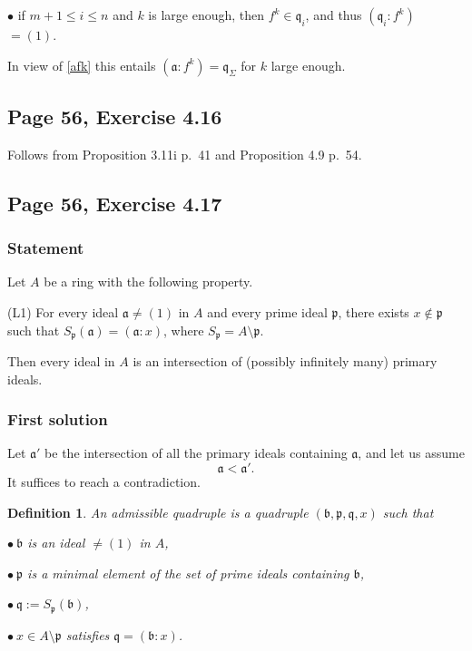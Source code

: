 \documentclass[parskip=half,fontsize=12pt]{scrartcl}%
\newcommand{\mf}{\mathfrak}
\newcommand{\aaa}{\mf a}
\newcommand{\bbb}{\mf b}
\newcommand{\ppp}{\mf p}
\newcommand{\qqq}{\mf q}
\newcommand{\bu}{\bullet}
\newtheorem{df}[thm]{Definition}
\begin{document}
$\bu$ if $m+1\le i\le n$ and $k$ is large enough, then $f^k\in\qqq_i$, and thus $(\qqq_i:f^k)$ $=(1)$.

In view of \eqref{afk} this entails $(\aaa:f^k)=\qqq_\Sigma$ for $k$ large enough.

\subsection{Page 56, Exercise 4.16}%

Follows from Proposition 3.11i p.~41 and Proposition 4.9 p.~54.

\subsection{Page 56, Exercise 4.17}%

\subsubsection{Statement}\label{417}%

Let $A$ be a ring with the following property.

(L1) For every ideal $\mathfrak a\ne(1)$ in $A$ and every prime ideal $\mathfrak p$, there exists $x\notin\mathfrak p$ such that $S_{\mathfrak p}(\mathfrak a)=(\mathfrak a:x)$, where $S_{\mathfrak p}=A\setminus\mathfrak p$.

Then every ideal in $A$ is an intersection of (possibly infinitely many) primary ideals.

\subsubsection{First solution}%

Let $\aaa'$ be the intersection of all the primary ideals containing $\aaa$, and let us assume  
\begin{equation}\label{abs417}
\aaa<\aaa'.
\end{equation} 
It suffices to reach a contradiction.

\begin{df} 
An \emph{admissible quadruple} is a quadruple $(\bbb,\ppp,\qqq,x)$ such that 

$\bu\ \bbb$ is an ideal $\ne(1)$ in $A$, 

$\bu\ \mathfrak p$ is a minimal element of the set of prime ideals containing $\bbb$, 

$\bu\ \mathfrak q:=S_{\mathfrak p}(\bbb)$, 

$\bu\ x\in A\setminus\ppp$ satisfies $\mathfrak q=(\bbb:x)$. 
\end{df}
\end{document}
